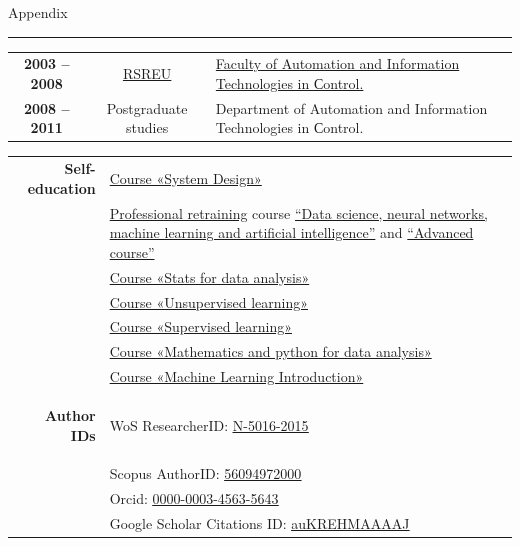 \documentclass[11pt]{article}
\begin{document}
	\newpage
	Appendix
	\hrule
	\vspace{1em}
	
	
	\begin{tabular} {c | c | p{}}
		\textbf{2003 -- 2008} & \href{http://www.rsreu.ru/en/}{RSREU} & \href{http://www.rsreu.ru/en/about-university/faculties-and-departments/faculty-of-automation-and-information-technologies-in-sontrol}{Faculty of Automation and Information Technologies in Сontrol.} \vspace{0.5em}\\
		\textbf{2008 -- 2011} & Postgraduate studies & Department of Automation and Information Technologies in Сontrol.\\
	\end{tabular}
	
	\begin{longtable} {r | p{}}
		\textbf{Self-education}
		& 
		\href{https://lab.karpov.courses/certificate/752f8aad-7f6e-40ad-98c2-12efe12bc0b7/en/}{Course «System Design»}\\
		&
		\href{https://disk.yandex.ru/i/H5-s3Lw6j-1wkg}{Professional retraining} course \href{https://disk.yandex.ru/i/UO1qC0H4FCa8LQ}{\textquotedblleft Data science, neural networks, machine learning and artificial intelligence\textquotedblright} \cite{inpainting} and \href{https://disk.yandex.ru/i/t3yNB56C3nNo5A}{\textquotedblleft Advanced course\textquotedblright}\\
		&  \href{https://www.coursera.org/account/accomplishments/certificate/DMUZAUCWBQG4}{Course «Stats for data analysis»}\\
		& \href{https://www.coursera.org/account/accomplishments/certificate/H8BWKAK4Y96D}{Course «Unsupervised learning»}\\
		& \href{https://www.coursera.org/account/accomplishments/certificate/9GQC5C4UP9YB}{Course «Supervised learning»}\\
		& \href{https://www.coursera.org/account/accomplishments/certificate/2AZHZW96LJ2N}{Course «Mathematics and python for data analysis»}\\
		\vspace{1em} & 
		\href{https://www.coursera.org/account/accomplishments/certificate/6K5Z2UFA5887}{Course «Machine Learning Introduction»}\\
		
		\hypertarget{AutorIDs}{\textbf{Author IDs}} & WoS ResearcherID: \href{https://publons.com/researcher/2345963/nikita-y-shubin/}{\underline{N-5016-2015}}\\
		& Scopus AuthorID: \href{https://www.scopus.com/authid/detail.uri?authorId=56094972000}{\underline{56094972000}}\\
		& Orcid: \href{https://orcid.org/0000-0003-4563-5643}{\underline{0000-0003-4563-5643}}\\
		& Google Scholar Citations ID: \href{https://scholar.google.com/citations?user=auKREHMAAAAJ}{\underline{auKREHMAAAAJ}}
	\end{longtable}
	
	
\end{document}

